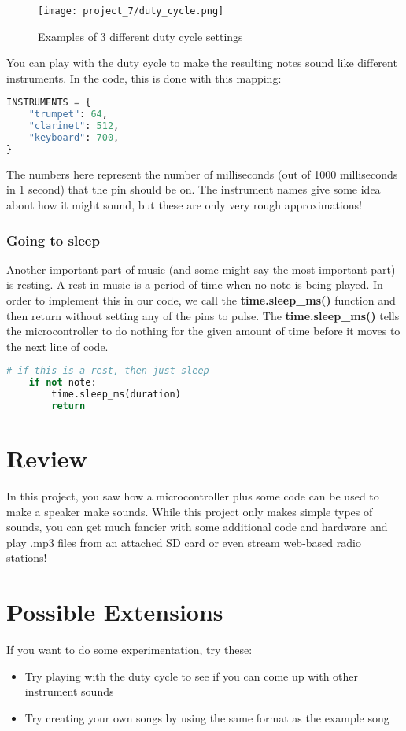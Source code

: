\begin{figure}[H]
    \centering
    \texttt{[image: project\_7/duty\_cycle.png]}
    \caption{Examples of 3 different duty cycle settings}
\end{figure}

You can play with the duty cycle to make the resulting notes sound like different instruments.
In the code, this is done with this mapping:

\begin{lstlisting}[language=Python,caption=Instrument names mapped to duty cycle settings]
INSTRUMENTS = {
    "trumpet": 64,
    "clarinet": 512,
    "keyboard": 700,
}
\end{lstlisting}

The numbers here represent the number of milliseconds (out of 1000 milliseconds in 1 second)
that the pin should be on. The instrument names give some idea about how it might sound, but
these are only very rough approximations!

\subsubsection{Going to sleep}

Another important part of music (and some might say the most important part) is resting.
A rest in music is a period of time when no note is being played. In order to implement
this in our code, we call the \textbf{time.sleep_ms()} function and then return without
setting any of the pins to pulse. The \textbf{time.sleep_ms()} tells the microcontroller to
do nothing for the given amount of time before it moves to the next line of code.

\begin{lstlisting}[language=Python,caption=Using the sleep function]
    # if this is a rest, then just sleep
    if not note:
        time.sleep_ms(duration)
        return
\end{lstlisting}


\section{Review}

In this project, you saw how a microcontroller plus some code can be used to make
a speaker make sounds. While this project only makes simple types of sounds, you
can get much fancier with some additional code and hardware and play .mp3 files
from an attached SD card or even stream web-based radio stations!

\section{Possible Extensions}
If you want to do some experimentation, try these:

\begin{itemize}
    \item Try playing with the duty cycle to see if you can come up with other instrument sounds
    \item Try creating your own songs by using the same format as the example song
\end{itemize}
